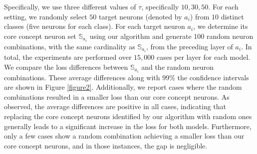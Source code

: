 Specifically, we use three different values of $\tau$, specifically $10, 30, 50$. For each setting, we randomly select $50$ target neurons (denoted by $a_i$) from $10$ distinct classes (five neurons for each class). For each target neuron $a_i$, we determine its core concept neuron set $\mathbb{S}_{a_i}$ using our algorithm and generate 100 random neuron combinations, with the same cardinality as $\mathbb{S}_{a_i}$, from the preceding layer of $a_i$. In total, the experiments are performed over $15,000$ cases per layer for each model.
We compare the loss differences between $\mathbb{S}_{a_i}$ and the random neuron combinations. These average differences along with 99\% the confidence intervals are shown in Figure \ref{figure2}. Additionally, we report cases where the random combinations resulted in a smaller loss than our core concept neurons. As observed, the average differences are positive in all cases, indicating that replacing the core concept neurons identified by our algorithm with random ones generally leads to a significant increase in the loss for both models. Furthermore, only a few cases show a random combination achieving a smaller loss than our core concept neurons, and in those instances, the gap is negligible.

